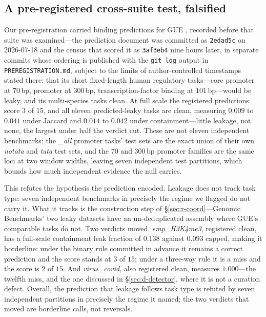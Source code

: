 \documentclass[webpdf,modern,large,namedate]{oup-authoring-template}%
\begin{document}
\subsection{A pre-registered cross-suite test, falsified}\label{sec:r-gue}
Our pre-registration carried binding predictions for GUE \citep{zhou2023dnabert2}, recorded before that suite was examined---the prediction document was committed as \texttt{2edad5c} on 2026-07-18 and the census that scored it as \texttt{3af3eb4} nine hours later, in separate commits whose ordering is published with the \texttt{git log} output in \texttt{PREREGISTRATION.md}, subject to the limits of author-controlled timestamps stated there: that its short fixed-length human regulatory tasks---core promoter at $70$\,bp, promoter at $300$\,bp, transcription-factor binding at $101$\,bp---would be leaky, and its multi-species tasks clean. At full scale the registered predictions score $3$ of $15$, and all eleven predicted-leaky tasks are clean, measuring $0.009$ to $0.041$ under Jaccard and $0.014$ to $0.042$ under containment---little leakage, not none, the largest under half the verdict cut. These are not eleven independent benchmarks: the \textit{\_all} promoter tasks' test sets are the exact union of their own \textit{notata} and \textit{tata} test sets, and the $70$ and $300$\,bp promoter families are the same loci at two window widths, leaving seven independent test partitions, which bounds how much independent evidence the null carries.

This refutes the hypothesis the prediction encoded. Leakage does not track task type: seven independent benchmarks in precisely the regime we flagged do not carry it. What it tracks is the construction step of \S\ref{sec:r-coord}---Genomic Benchmarks' two leaky datasets have an un-deduplicated assembly where GUE's comparable tasks do not. Two verdicts moved. \textit{emp\_H3K4me3}, registered clean, has a full-scale containment leak fraction of $0.138$ against $0.093$ capped, making it borderline: under the binary rule committed in advance it remains a correct prediction and the score stands at $3$ of $15$; under a three-way rule it is a miss and the score is $2$ of $15$. And \textit{virus\_covid}, also registered clean, measures $1.000$---the twelfth miss, and the one discussed in \S\ref{sec:d-detector}, where it is not a curation defect. Overall, the prediction that leakage follows task type is refuted by seven independent partitions in precisely the regime it named; the two verdicts that moved are borderline calls, not reversals.
\end{document}
